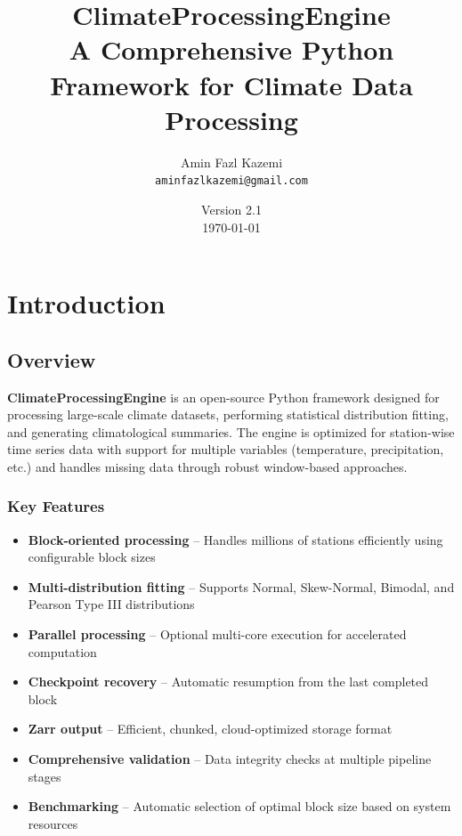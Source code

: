 ﻿\documentclass[12pt,a4paper]{report}
\title{\Huge\textbf{ClimateProcessingEngine}\\ \Large A Comprehensive Python Framework for Climate Data Processing}
\author{Amin Fazl Kazemi\\ \texttt{aminfazlkazemi@gmail.com}}
\date{Version 2.1 \\ \today}
\begin{document}
\sloppy

\maketitle
\tableofcontents
\listoffigures
\listoftables
\lstlistoflistings

\chapter{Introduction}
\section{Overview}

\textbf{ClimateProcessingEngine} is an open-source Python framework designed for processing large-scale climate datasets, performing statistical distribution fitting, and generating climatological summaries. The engine is optimized for station-wise time series data with support for multiple variables (temperature, precipitation, etc.) and handles missing data through robust window-based approaches.

\subsection{Key Features}
\begin{itemize}[leftmargin=*]
    \item \textbf{Block-oriented processing} – Handles millions of stations efficiently using configurable block sizes
    \item \textbf{Multi-distribution fitting} – Supports Normal, Skew-Normal, Bimodal, and Pearson Type III distributions
    \item \textbf{Parallel processing} – Optional multi-core execution for accelerated computation
    \item \textbf{Checkpoint recovery} – Automatic resumption from the last completed block
    \item \textbf{Zarr output} – Efficient, chunked, cloud-optimized storage format
    \item \textbf{Comprehensive validation} – Data integrity checks at multiple pipeline stages
    \item \textbf{Benchmarking} – Automatic selection of optimal block size based on system resources
\end{itemize}
\end{document}
